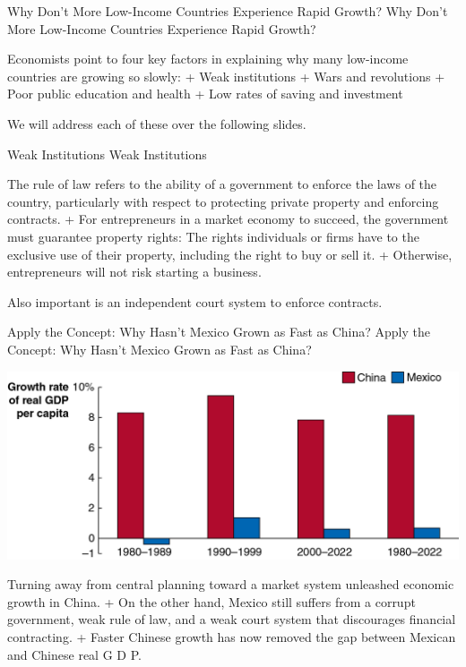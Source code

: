 \documentclass[
  12pt,
  ignorenonframetext,
]{beamer}
\begin{document}
\begin{frame}{Why Don't More Low-Income Countries Experience Rapid
Growth?}
\protect\hypertarget{why-dont-more-low-income-countries-experience-rapid-growth}{}
Why Don't More Low-Income Countries Experience Rapid Growth?

Economists point to four key factors in explaining why many low-income
countries are growing so slowly: + Weak institutions + Wars and
revolutions + Poor public education and health + Low rates of saving and
investment

We will address each of these over the following slides.
\end{frame}

\begin{frame}{Weak Institutions}
\protect\hypertarget{weak-institutions}{}
Weak Institutions

The rule of law refers to the ability of a government to enforce the
laws of the country, particularly with respect to protecting private
property and enforcing contracts. + For entrepreneurs in a market
economy to succeed, the government must guarantee property rights: The
rights individuals or firms have to the exclusive use of their property,
including the right to buy or sell it. + Otherwise, entrepreneurs will
not risk starting a business.

Also important is an independent court system to enforce contracts.
\end{frame}

\begin{frame}{Apply the Concept: Why Hasn't Mexico Grown as Fast as
China?}
\protect\hypertarget{apply-the-concept-why-hasnt-mexico-grown-as-fast-as-china}{}
Apply the Concept: Why Hasn't Mexico Grown as Fast as China?

\includegraphics[width=\textwidth,height=0.99\textheight]{imgs3/img_slide45a.png}

Turning away from central planning toward a market system unleashed
economic growth in China. + On the other hand, Mexico still suffers from
a corrupt government, weak rule of law, and a weak court system that
discourages financial contracting. + Faster Chinese growth has now
removed the gap between Mexican and Chinese real G D P.
\end{frame}
\end{document}
